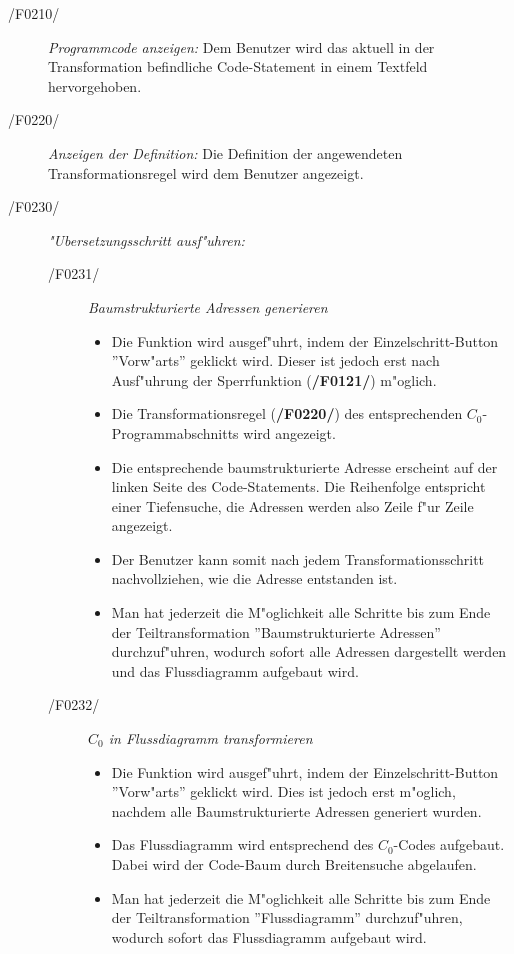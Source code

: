   \begin{description}
    \item[/F0210/]
      \textit{Programmcode anzeigen:} Dem Benutzer wird das aktuell in der
      Transformation befindliche Code-Statement in einem Textfeld hervorgehoben.
    \item[/F0220/]
      \textit{Anzeigen der Definition:} Die Definition der angewendeten
      Transformationsregel wird dem Benutzer angezeigt.
    \item[/F0230/]
      \textit{"Ubersetzungsschritt ausf"uhren:}
      \begin{description}
        \item[/F0231/]
        \textit{Baumstrukturierte Adressen generieren}
        \begin{itemize}
          \item Die Funktion wird ausgef"uhrt, indem der Einzelschritt-Button
          ''Vorw"arts'' geklickt wird. Dieser ist jedoch erst nach
          Ausf"uhrung der Sperrfunktion (\textbf{/F0121/}) m"oglich.
          \item Die Transformationsregel (\textbf{/F0220/}) des entsprechenden
          $C_0$-Programmabschnitts wird angezeigt.
          \item Die entsprechende baumstrukturierte Adresse erscheint auf der
          linken Seite des Code-Statements.
					Die Reihenfolge entspricht einer Tiefensuche, die Adressen werden also Zeile f"ur Zeile angezeigt.
          \item Der Benutzer kann somit nach jedem Transformationsschritt
          nachvollziehen, wie die Adresse entstanden ist.
          \item Man hat jederzeit die M"oglichkeit alle Schritte bis zum Ende
          der Teiltransformation ''Baumstrukturierte Adressen'' durchzuf"uhren,
          wodurch sofort alle Adressen dargestellt werden und das
          Flussdiagramm aufgebaut wird.  
        \end{itemize}

        \item[/F0232/]
        \textit{$C_0$ in Flussdiagramm transformieren}
        \begin{itemize}
          \item Die Funktion wird ausgef"uhrt, indem der Einzelschritt-Button
          ''Vorw"arts'' geklickt wird. Dies ist jedoch erst m"oglich, nachdem alle Baumstrukturierte Adressen generiert wurden.
          \item Das Flussdiagramm wird entsprechend des $C_0$-Codes aufgebaut.
					Dabei wird der Code-Baum durch Breitensuche abgelaufen.
          \item Man hat jederzeit die M"oglichkeit alle Schritte bis zum Ende
          der Teiltransformation ''Flussdiagramm'' durchzuf"uhren, wodurch sofort
          das Flussdiagramm aufgebaut wird.  
        \end{itemize}


\end{description}
\end{description}
